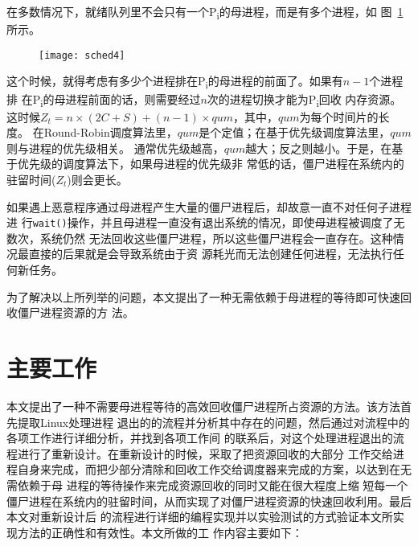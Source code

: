 \documentclass{swfuthesism}
\begin{document}
在多数情况下，就绪队列里不会只有一个P\textsubscript{i}的母进程，而是有多个进程，如
图~\ref{fig:sched4}所示。

\begin{figure}[ht]
  \centering
  \texttt{[image: sched4]}
  \label{fig:sched4}
\end{figure}

这个时候，就得考虑有多少个进程排在P\textsubscript{i}的母进程的前面了。如果有$n-1$个进程排
在P\textsubscript{i}的母进程前面的话，则需要经过$n$次的进程切换才能为P\textsubscript{i}回收
内存资源。这时候$Z_t=n\times{}(2C+S)+(n-1)\times{}qum$，其中，$qum$为每个时间片的长度。
在Round-Robin调度算法里，$qum$是个定值；在基于优先级调度算法里，$qum$则与进程的优先级相关。
通常优先级越高，$qum$越大；反之则越小。于是，在基于优先级的调度算法下，如果母进程的优先级非
常低的话，僵尸进程在系统内的驻留时间($Z_t$)则会更长。

如果遇上恶意程序通过母进程产生大量的僵尸进程后，却故意一直不对任何子进程进
行\texttt{wait()}操作，并且母进程一直没有退出系统的情况，即使母进程被调度了无数次，系统仍然
无法回收这些僵尸进程，所以这些僵尸进程会一直存在。这种情况最直接的后果就是会导致系统由于资
源耗光而无法创建任何进程，无法执行任何新任务。

为了解决以上所列举的问题，本文提出了一种无需依赖于母进程的等待即可快速回收僵尸进程资源的方
法。

\section{主要工作}

本文提出了一种不需要母进程等待的高效回收僵尸进程所占资源的方法。该方法首先提取Linux处理进程
退出的的流程并分析其中存在的问题，然后通过对流程中的各项工作进行详细分析，并找到各项工作间
的联系后，对这个处理进程退出的流程进行了重新设计。在重新设计的时候，采取了把资源回收的大部分
工作交给进程自身来完成，而把少部分清除和回收工作交给调度器来完成的方案，以达到在无需依赖于母
进程的等待操作来完成资源回收的同时又能在很大程度上缩
短每一个僵尸进程在系统内的驻留时间，从而实现了对僵尸进程资源的快速回收利用。最后本文对重新设计后
的流程进行详细的编程实现并以实验测试的方式验证本文所实现方法的正确性和有效性。本文所做的工
作内容主要如下： 
\end{document}
